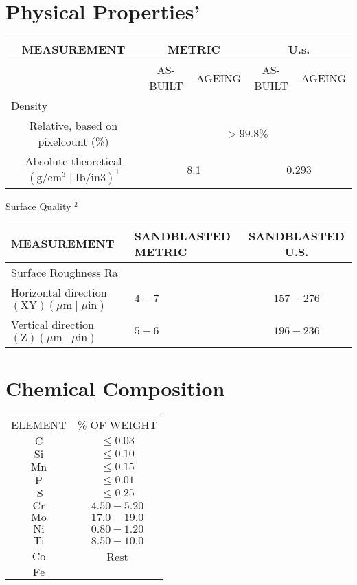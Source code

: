 \documentclass[10pt]{article}
\begin{document}
\section*{Physical Properties'}
\begin{center}
\begin{tabular}{|c|c|c|c|c|}
\hline
\multirow{2}{*}{MEASUREMENT} & \multicolumn{2}{|c|}{METRIC} & \multicolumn{2}{|c|}{U.s.} \\
\hline
 & AS-BUILT & AGEING & AS-BUILT & AGEING \\
\hline
\multicolumn{5}{|l|}{Density} \\
\hline
Relative, based on pixelcount (\%) & \multicolumn{4}{|c|}{$>99.8 \%$} \\
\hline
Absolute theoretical $\left(\mathrm{g} / \mathrm{cm}^{3} \mid \mathrm{Ib} / \mathrm{in} 3\right)^{1}$ & \multicolumn{2}{|c|}{8.1} & \multicolumn{2}{|c|}{0.293} \\
\hline
\end{tabular}
\end{center}

Surface Quality ${ }^{2}$

\begin{center}
\begin{tabular}{llc}
\hline
MEASUREMENT & SANDBLASTED METRIC & SANDBLASTED U.S. \\
\hline
Surface Roughness Ra &  &  \\
\hline
Horizontal direction $(\mathrm{XY})(\mu \mathrm{m} \mid \mu \mathrm{in})$ & $4-7$ & $157-276$ \\
Vertical direction $(\mathrm{Z})(\mu \mathrm{m} \mid \mu \mathrm{in})$ & $5-6$ & $196-236$ \\
\end{tabular}
\end{center}

\section*{Chemical Composition}
\begin{center}
\begin{tabular}{cc}
ELEMENT & \% OF WEIGHT \\
$\mathrm{C}$ & $\leq 0.03$ \\
$\mathrm{Si}$ & $\leq 0.10$ \\
$\mathrm{Mn}$ & $\leq 0.15$ \\
$\mathrm{P}$ & $\leq 0.01$ \\
$\mathrm{~S}$ & $\leq 0.25$ \\
$\mathrm{Cr}$ & $4.50-5.20$ \\
$\mathrm{Mo}$ & $17.0-19.0$ \\
$\mathrm{Ni}$ & $0.80-1.20$ \\
$\mathrm{Ti}$ & $8.50-10.0$ \\
$\mathrm{Co}$ & Rest \\
$\mathrm{Fe}$ &  \\
\end{tabular}
\end{center}
\end{document}
